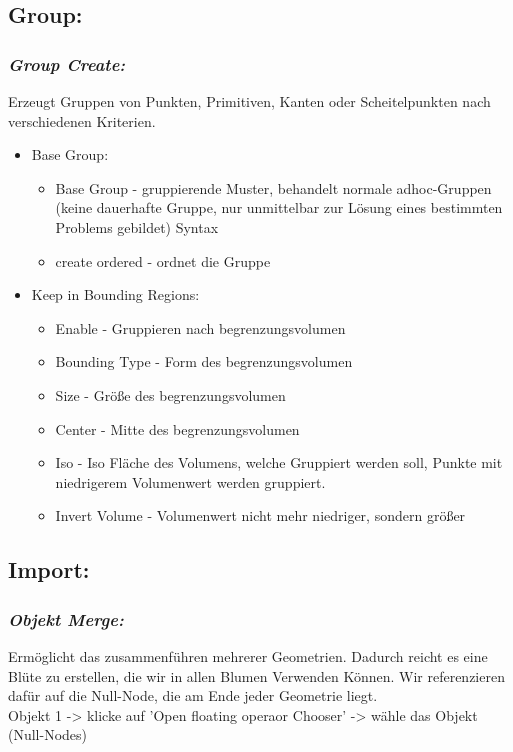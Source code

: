 \documentclass[paper=a4,fontsize=12pt,ngerman]{scrartcl}
\begin{document}
	\subsection*{Group:}
	\subsubsection*{\textit{Group Create:}}
	Erzeugt Gruppen von Punkten, Primitiven, Kanten oder Scheitelpunkten nach verschiedenen Kriterien.
	\begin{itemize}
		\item Base Group:	
		\begin{itemize}
			\item Base Group - gruppierende Muster, behandelt normale adhoc-Gruppen (keine dauerhafte Gruppe, nur unmittelbar zur Lösung eines bestimmten Problems gebildet) Syntax
			\item create ordered - ordnet die Gruppe
		\end{itemize}
		\item Keep in Bounding Regions:
		\begin{itemize}
			\item Enable	- Gruppieren nach begrenzungsvolumen
			\item Bounding Type - Form des begrenzungsvolumen
			\item Size - Größe des begrenzungsvolumen
			\item Center - Mitte des begrenzungsvolumen
			\item Iso - Iso Fläche des Volumens, welche Gruppiert werden soll, Punkte mit niedrigerem Volumenwert werden gruppiert. 
			\item Invert Volume - Volumenwert nicht mehr niedriger, sondern größer
		\end{itemize}
	\end{itemize}

	\subsection*{Import:}
	\subsubsection*{\textit{Objekt Merge:}}
	Ermöglicht das zusammenführen mehrerer Geometrien. Dadurch reicht es eine Blüte zu erstellen, die wir in allen Blumen Verwenden Können. Wir referenzieren dafür auf die Null-Node, die am Ende jeder Geometrie liegt.\\
	Objekt 1 -> klicke auf 'Open floating operaor Chooser' -> wähle das Objekt (Null-Nodes)
	
\end{document}
